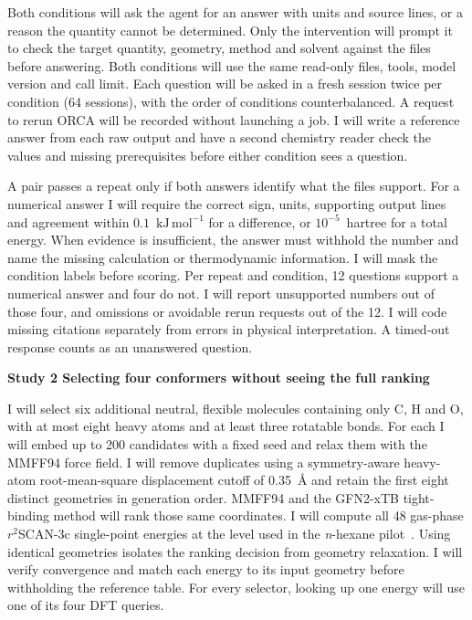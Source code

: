 \documentclass[12pt,a4paper]{article}
\newcommand{\subhead}[1]{\par\addvspace{0.4em}\textbf{#1}\par\nobreak}
\newcommand{\unitE}{\ensuremath{\mathrm{kJ\,mol^{-1}}}}
\begin{document}
Both conditions will ask the agent for an answer with units and source lines,
or a reason the quantity cannot be determined. Only the intervention will
prompt it to check the target quantity, geometry, method and solvent against
the files before answering. Both conditions will use the same read-only files,
tools, model version and call limit. Each question will be
asked in a fresh session twice per condition (64 sessions), with the order of
conditions counterbalanced. A request to rerun ORCA will be recorded without
launching a job. I will write a reference answer from each raw output and
have a second chemistry reader check the values and missing prerequisites
before either condition sees a question.

A pair passes a repeat only if both answers identify what the files support.
For a numerical answer I will require the correct sign, units, supporting
output lines and agreement within $0.1$~\unitE{} for a difference, or
$10^{-5}$~hartree for a total energy. When evidence is insufficient,
the answer must withhold the number and name the missing calculation or
thermodynamic information. I will mask the condition labels before scoring.
Per repeat and condition, 12 questions support a numerical answer and four
do not. I will report unsupported numbers out of those four, and omissions or
avoidable rerun requests out of the 12. I will code missing citations
separately from errors in physical interpretation. A timed-out response
counts as an unanswered question.

\clearpage
\subhead{Study 2 \enspace Selecting four conformers without seeing the full ranking}
I will select six additional neutral, flexible molecules containing only C,
H and O, with at most eight heavy atoms and at least three rotatable bonds.
For each I will embed up to 200 candidates with a fixed seed and relax them
with the MMFF94 force field. I will remove duplicates using a symmetry-aware heavy-atom
root-mean-square displacement cutoff of 0.35~\AA{} and retain the first eight
distinct geometries in generation order. MMFF94 and the GFN2-xTB tight-binding
method will rank those same coordinates. I will compute all 48 gas-phase
$r^2$SCAN-3c single-point energies at the level used in the \emph{n}-hexane
pilot~\cite{archive}. Using identical geometries isolates the ranking decision
from geometry relaxation. I will verify convergence and match each energy to
its input geometry before withholding the reference table. For every selector,
looking up one energy will use one of its four DFT queries.
\end{document}
